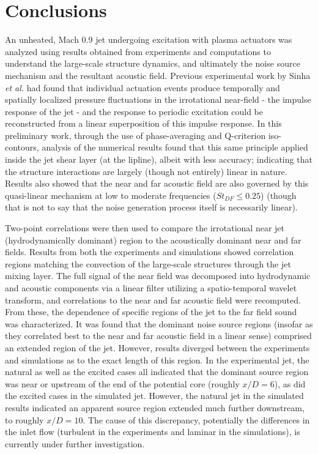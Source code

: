 \documentclass[english]{aiaa-tc}
\begin{document}
\section{Conclusions}
An unheated, Mach 0.9 jet undergoing excitation with plasma actuators was analyzed using results obtained from experiments and computations to understand the large-scale structure dynamics, and ultimately the noise source mechanism and the resultant acoustic field. Previous experimental work by Sinha \textit{et al.}\cite{sinha2013} had found that individual actuation events produce temporally and spatially localized pressure fluctuations in the irrotational near-field - the impulse response of the jet - and the response to periodic excitation could be reconstructed from a linear superposition of this impulse response. In this preliminary work, through the use of phase-averaging and Q-criterion iso-contours, analysis of the numerical results found that this same principle applied inside the jet shear layer (at the lipline), albeit with less accuracy; indicating that the structure interactions are largely (though not entirely) linear in nature. Results also showed that the near and far acoustic field are also governed by this quasi-linear mechanism at low to moderate frequencies ($St_{DF} \leq 0.25$) (though that is not to say that the noise generation process itself is necessarily linear).

Two-point correlations were then used to compare the irrotational near jet (hydrodynamically dominant) region to the acoustically dominant near and far fields.
Results from both the experiments and simulations showed correlation regions matching the convection of the large-scale structures through the jet mixing layer.
The full signal of the near field was decomposed into hydrodynamic and acoustic components via a linear filter utilizing a spatio-temporal wavelet transform, and correlations to the near and far acoustic field were recomputed.
From these, the dependence of specific regions of the jet to the far field sound was characterized.
It was found that the dominant noise source regions (insofar as they correlated best to the near and far acoustic field in a linear sense) comprised an extended region of the jet. However, results diverged between the experiments and simulations as to the exact length of this region. In the experimental jet, the natural as well as the excited cases all indicated that the dominant source region was near or upstream of the end of the potential core (roughly $x/D = 6$), as did the excited cases in the simulated jet. However, the natural jet in the simulated results indicated an apparent source region extended much further downstream, to roughly $x/D = 10$. The cause of this discrepancy, potentially the differences in the inlet flow (turbulent in the experiments and laminar in the simulations), is currently under further investigation.
\end{document}
